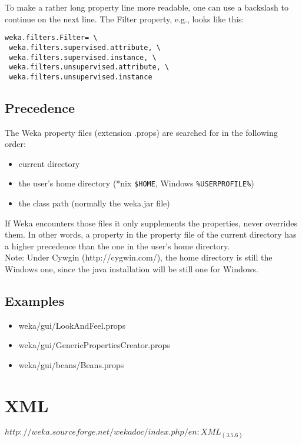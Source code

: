 \noindent To make a rather long property line more readable, one can
use a backslash to continue on the next line. The Filter property,
e.g., looks like this:

\begin{verbatim}
weka.filters.Filter= \
 weka.filters.supervised.attribute, \
 weka.filters.supervised.instance, \
 weka.filters.unsupervised.attribute, \
 weka.filters.unsupervised.instance
\end{verbatim}

\subsection{Precedence}
The Weka property files (extension .props) are searched for in the following order:

\begin{itemize}
\item current directory
\item the user's home directory (*nix \verb=$HOME=, Windows \verb=%USERPROFILE%=)
\item the class path (normally the weka.jar file) 
\end{itemize}

\noindent If Weka encounters those files it only supplements the
properties, never overrides them. In other words, a property in the
property file of the current directory has a higher precedence than
the one in the user's home directory.\\

\noindent Note: Under Cywgin (http://cygwin.com/), the home directory
is still the Windows one, since the java installation will be still
one for Windows.

\subsection{Examples}

\begin{itemize}
\item weka/gui/LookAndFeel.props
\item weka/gui/GenericPropertiesCreator.props
\item weka/gui/beans/Beans.props
\end{itemize}


\section{XML}
$http://weka.sourceforge.net/wekadoc/index.php/en:XML_(3.5.6)$
